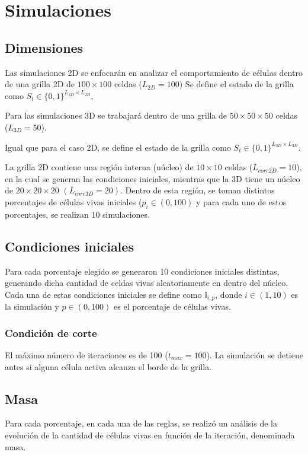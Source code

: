 \section{Simulaciones}
\label{sec:simulaciones}

\subsection{Dimensiones}
\label{subsec:acdim}
Las simulaciones 2D se enfocarán en analizar el comportamiento de células dentro de una grilla 2D de $100 \times 100$ celdas ($L_{2D} = 100$)
Se define el estado de la grilla como $S_t \in \{0,1\}^{L_{2D}\times L_{2D}}$,

Para las simulaciones 3D se trabajará dentro de una grilla de $50 \times 50 \times 50$ celdas ($L_{3D} = 50$).

Igual que para el caso 2D, se define el estado de la grilla como $S_t \in \{0,1\}^{L_{3D}\times L_{3D}}$.

La grilla 2D contiene una región interna (núcleo) de $10 \times 10$ celdas ($L_{core2D} = 10$), en la cual se generan las condiciones iniciales,
mientras que la 3D tiene un núcleo de $20 \times 20 \times 20$ $(L_{core3D} = 20)$.
Dentro de esta región, se toman distintos porcentajes de células vivas iniciales ($p_i \in (0, 100)$ y para cada uno de estos porcentajes, se realizan 10 simulaciones.

\subsection{Condiciones iniciales}
\label{subsec:acini}
Para cada porcentaje elegido se generaron 10 condiciones iniciales distintas, generando dicha cantidad de celdas vivas aleatoriamente en dentro del núcleo.
Cada una de estas condiciones iniciales se define como $\mathbb{I}_{i,p}$, donde $i \in (1, 10)$ es la simulación y $p \in (0, 100)$ es el porcentaje de células vivas.

\subsubsection{Condición de corte}
\label{subsubsec:ac2corte}
El máximo número de iteraciones es de 100 ($t_{max} = 100$).
La simulación se detiene antes si alguna célula activa alcanza el borde de la grilla.

\subsection{Masa}
Para cada porcentaje, en cada una de las reglas, se realizó un análisis de la evolución de la cantidad de células vivas en función de la iteración, denominada masa.

